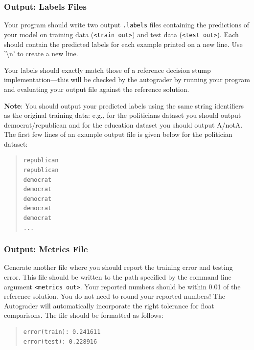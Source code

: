 \documentclass[11pt,addpoints,answers]{exam}
\numberwithin{equation}{section} %
\numberwithin{figure}{section} %
\numberwithin{table}{section} %
\begin{document}
\subsubsection{Output: Labels Files}
\label{sec:labels}

Your program should write two output \lstinline{.labels} files containing the predictions of your model on training data (\lstinline{<train out>}) and test data (\lstinline{<test out>}). Each should contain the predicted labels for each example printed on a new line. Use '\textbackslash n' to create a new line.

Your labels should exactly match those of a reference decision stump implementation---this will be checked by the autograder by running your program and evaluating your output file against the reference solution.

\textbf{Note}: You should output your predicted labels using the same string identifiers as the original training data: e.g., for the politicians dataset you should output democrat/republican and for the education dataset you should output A/notA.
%
The first few lines of an example output file is given below for the politician dataset:
\begin{quote}
\begin{verbatim}
republican
republican
democrat
democrat
democrat
democrat
democrat
...
\end{verbatim}
\end{quote}

\subsubsection{Output: Metrics File}
\label{sec:metrics}

Generate another file where you should report the training error and testing error. This file should be written to the path specified by the command line argument \lstinline{<metrics out>}. Your reported numbers should be within 0.01 of the reference solution. You do not need to round your reported numbers! The Autograder will automatically incorporate the right tolerance for float comparisons. The file should be formatted as follows:

\begin{quote}
\begin{verbatim}
error(train): 0.241611
error(test): 0.228916
\end{verbatim}
\end{quote}
\end{document}
